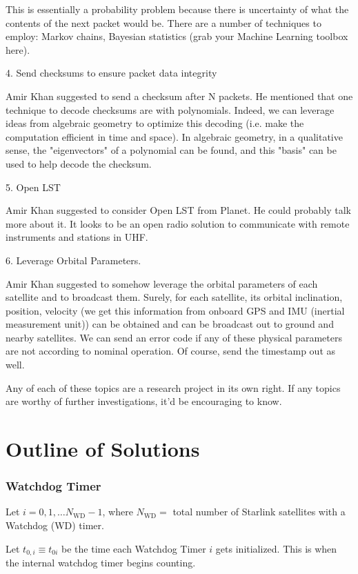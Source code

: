 \documentclass[10pt]{amsart}
\begin{document}
This is essentially a probability problem because there is uncertainty of what the contents of the next packet would be. There are a number of techniques to employ: Markov chains, Bayesian statistics (grab your Machine Learning toolbox here).

4. Send checksums to ensure packet data integrity

Amir Khan suggested to send a checksum after N packets. He mentioned that one technique to decode checksums are with polynomials. Indeed, we can leverage ideas from algebraic geometry to optimize this decoding (i.e. make the computation efficient in time and space). In algebraic geometry, in a qualitative sense, the "eigenvectors" of a polynomial can be found, and this "basis" can be used to help decode the checksum.

5. Open LST

Amir Khan suggested to consider Open LST from Planet. He could probably talk more about it.  It looks to be an open radio solution to communicate with remote instruments and stations in UHF. 

6. Leverage Orbital Parameters.

Amir Khan suggested to somehow leverage the orbital parameters of each satellite and to broadcast them. Surely, for each satellite, its orbital inclination, position, velocity (we get this information from onboard GPS and IMU (inertial measurement unit)) can be obtained and can be broadcast out to ground and nearby satellites. We can send an error code if any of these physical parameters are not according to nominal operation. Of course, send the timestamp out as well. 

Any of each of these topics are a research project in its own right. If any topics are worthy of further investigations, it'd be encouraging to know. 

\part{Outline of Solutions}

\section{Watchdog Timer} 

Let $i = 0 , 1, \dots N_{\text{WD}} - 1$, where $N_{\text{WD}} = $ total number of Starlink satellites with a Watchdog (WD) timer.

Let $t_{0,i} \equiv t_{0i}$ be the time each Watchdog Timer $i$ gets initialized. This is when the internal watchdog timer begins counting.
\end{document}

